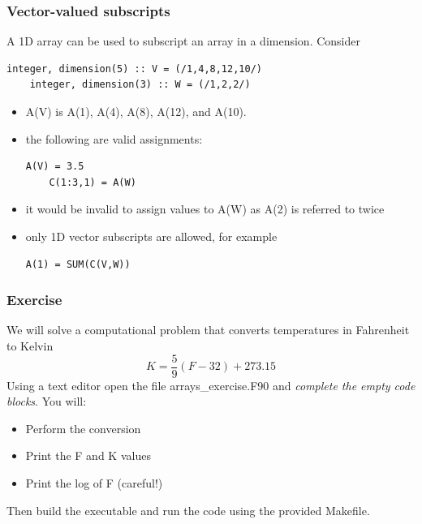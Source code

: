 \documentclass[11pt]{beamer}
\begin{document}
\begin{frame}[fragile]
\frametitle{Vector-valued subscripts}

\footnotesize{
A 1D array can be used to subscript an array in a dimension. Consider
\begin{lstlisting}[style=Fortran]
    integer, dimension(5) :: V = (/1,4,8,12,10/)
    integer, dimension(3) :: W = (/1,2,2/)
 \end{lstlisting}
\begin{itemize}
\item A(V) is A(1), A(4), A(8), A(12), and A(10).
\item the following are valid assignments:
\begin{lstlisting}[style=Fortran]
    A(V) = 3.5
    C(1:3,1) = A(W)
 \end{lstlisting}
\item it would be invalid to assign values to A(W) as A(2) is referred to twice
\item only 1D vector subscripts are allowed, for example
\begin{lstlisting}[style=Fortran]
    A(1) = SUM(C(V,W))
 \end{lstlisting}
 \end{itemize}
}

\end{frame}



\begin{frame}[fragile]
\frametitle{Exercise}

We will solve a computational problem that converts temperatures in Fahrenheit to Kelvin\\
\begin{equation}
K = \frac{5}{9}(F - 32) + 273.15
\end{equation}
Using a text editor open the file arrays\_exercise.F90 and \emph{complete the empty code blocks}. You will:
\begin{itemize}
\item Perform the conversion
\item Print the F and K values
\item Print the log of F (careful!)
 \end{itemize}
Then build the executable and run the code using the provided Makefile.

\end{frame}
\end{document}
